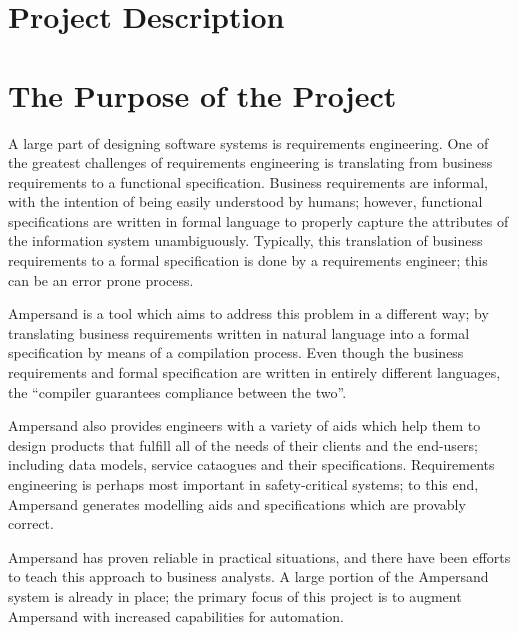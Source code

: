 \documentclass[12pt]{report}
\begin{document}
{\section{Project Description}\label{sec:Intro}}
{\section{The Purpose of the Project}\label{sec:Purpose}}
A large part of designing software systems is requirements engineering. One
of the greatest challenges of requirements engineering is translating from
business requirements to a functional specification. Business requirements are
informal, with the intention of being easily understood by humans; however,
functional specifications are written in formal language to properly capture the
attributes of the information system unambiguously. Typically, this translation
of business requirements to a formal specification is done by a requirements
engineer; this can be an error prone process. 

Ampersand is a tool which aims to address this problem in a different way; by
translating business requirements written in natural language into a formal
specification by means of a compilation process. %
Even though the business requirements and formal specification are written in
entirely different languages, the ``compiler guarantees compliance between the two''. %

Ampersand also provides engineers with a variety of aids which
help them to design products that fulfill all of the needs of their clients and
the end-users; including data models, service cataogues and their
specifications. Requirements engineering is perhaps most important in
safety-critical systems; to this end, Ampersand generates modelling aids and
specifications which are provably correct. %

Ampersand has proven reliable in practical situations, and there have been
efforts to teach this approach to business analysts. A large portion of the
Ampersand system is already in place; the primary focus of this project is to
augment Ampersand with increased capabilities for automation.
\end{document}
